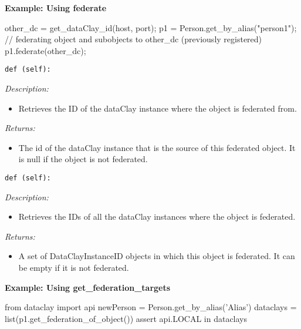 \begin{tBox}
\textcolor{basecolor} {\bf Example: Using federate}
\begin{python}
other_dc = get_dataClay_id(host, port);
p1 = Person.get_by_alias("person1");
// federating object and subobjects to other_dc (previously registered)
p1.federate(other_dc);
\end{python}
\end{tBox}


\begin{dBox}
\texttt{def (self):}
\LINE

{\it Description:}

\begin{itemize}
 \item Retrieves the ID of the dataClay instance where the object is federated from. 
\end{itemize}

{\it Returns:}

\begin{itemize}
 \item The id of the dataClay instance that is the source of this federated object.  
 It is null if the object is not federated.
\end{itemize}

\end{dBox}


\begin{dBox}
\texttt{def (self):}
\LINE

{\it Description:}

\begin{itemize}
 \item Retrieves the IDs of all the dataClay instances where the object is federated. 
\end{itemize}

{\it Returns:}

\begin{itemize}
 \item A set of DataClayInstanceID objects in which this object is federated. 
 It can be empty if it is not federated.
\end{itemize}

\end{dBox}

\begin{tBox}
\textcolor{basecolor} {\bf Example: Using get\_federation\_targets}
\begin{python}
from dataclay import api
newPerson = Person.get_by_alias('Alias')
dataclays = list(p1.get_federation_of_object())
assert api.LOCAL in dataclays
\end{python}
\end{tBox}

